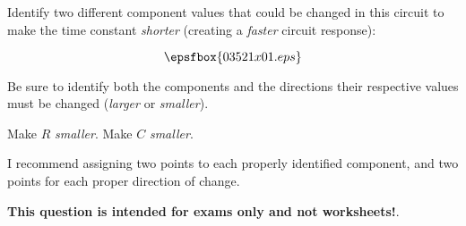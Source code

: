 

Identify two different component values that could be changed in this circuit to make the time constant {\it shorter} (creating a {\it faster} circuit response):

$$\epsfbox{03521x01.eps}$$

Be sure to identify both the components and the directions their respective values must be changed ({\it larger} or {\it smaller}).







Make $R$ {\it smaller}. \hskip 30pt Make $C$ {\it smaller}.

\vskip 10pt

I recommend assigning two points to each properly identified component, and two points for each proper direction of change.







{\bf This question is intended for exams only and not worksheets!}.



